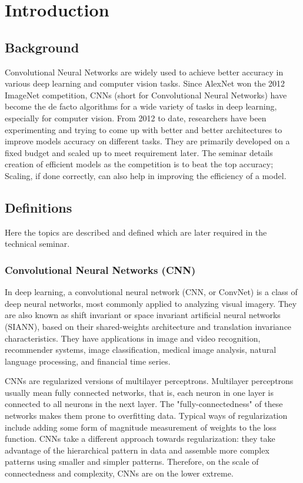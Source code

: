 \chapter{Introduction}
\section{Background}

Convolutional Neural Networks are widely used to achieve better accuracy in various deep learning and computer vision tasks. Since AlexNet won the 2012 ImageNet competition, CNNs (short for Convolutional Neural Networks) have become the de facto algorithms for a wide variety of tasks in deep learning, especially for computer vision. From 2012 to date, researchers have been experimenting and trying to come up with better and better architectures to improve models accuracy on different tasks. They are primarily developed on a fixed budget and scaled up to meet requirement later. The seminar details creation of efficient models as the competition is to beat the top accuracy; Scaling, if done correctly, can also help in improving the efficiency of a model.


\section{Definitions}

Here the topics are described and defined which are later required in the technical seminar.

\subsection{Convolutional Neural Networks (CNN)}

In deep learning, a convolutional neural network (CNN, or ConvNet) is a class of deep neural networks, most commonly applied to analyzing visual imagery. They are also known as shift invariant or space invariant artificial neural networks (SIANN), based on their shared-weights architecture and translation invariance characteristics. They have applications in image and video recognition, recommender systems, image classification, medical image analysis, natural language processing, and financial time series.

CNNs are regularized versions of multilayer perceptrons. Multilayer perceptrons usually mean fully connected networks, that is, each neuron in one layer is connected to all neurons in the next layer. The "fully-connectedness" of these networks makes them prone to overfitting data. Typical ways of regularization include adding some form of magnitude measurement of weights to the loss function. CNNs take a different approach towards regularization: they take advantage of the hierarchical pattern in data and assemble more complex patterns using smaller and simpler patterns. Therefore, on the scale of connectedness and complexity, CNNs are on the lower extreme.

